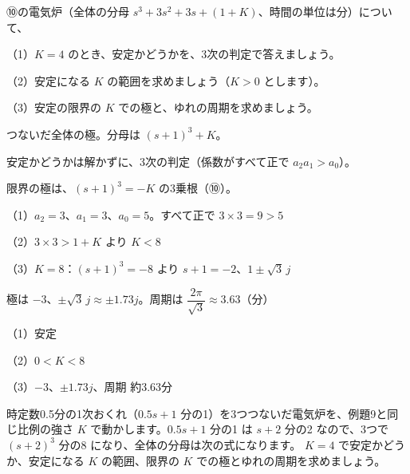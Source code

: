 \begin{reidai}[3次の電気炉の安定]
⑩の電気炉（全体の分母 $s^3+3s^2+3s+(1+K)$、時間の単位は分）について、\par
（1）$K=4$ のとき、安定かどうかを、3次の判定で答えましょう。\par
（2）安定になる $K$ の範囲を求めましょう（$K>0$ とします）。\par
（3）安定の限界の $K$ での極と、ゆれの周期を求めましょう。\par
\kangaekata {}\par
{}\enspace つないだ全体の極。分母は $(s+1)^3+K$。\par
{}\enspace 安定かどうかは解かずに、3次の判定（係数がすべて正で $a_2a_1>a_0$）。\par
{}\enspace 限界の極は、$(s+1)^3=-K$ の3乗根（⑩）。\par
\shiki\kixjs{}\zw{} （1）$a_2=3$、$a_1=3$、$a_0=5$。すべて正で $3\times3=9>5$\par
\kixja （2）$3\times3>1+K$ より $K<8$\par
\kixja （3）$K=8$：$(s+1)^3=-8$ より $s+1=-2$、$1\pm\sqrt3\,j$\par
\kixjb 極は $-3$、$\pm\sqrt3\,j\approx\pm1.73j$。周期は $\dfrac{2\pi}{\sqrt3}\approx3.63$（分）\par
\kotae\kixjs{}\zw{} （1）安定\par
\kixja （2）$0<K<8$\par
\kixja （3）$-3$、$\pm1.73j$、周期 約3.63分
\end{reidai}

\begin{jibun}
時定数0.5分の1次おくれ（$0.5s+1$ 分の1）を3つつないだ電気炉を、例題9と同じ比例の強さ $K$ で動かします。$0.5s+1$ 分の1 は $s+2$ 分の2 なので、3つで $(s+2)^3$ 分の8 になり、全体の分母は次の式になります。
$K=4$ で安定かどうか、安定になる $K$ の範囲、限界の $K$ での極とゆれの周期を求めましょう。
\end{jibun}

